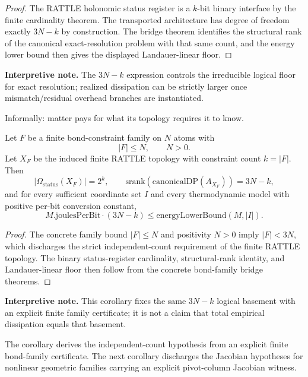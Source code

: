 \begin{proof}
The RATTLE holonomic status register is a $k$-bit binary interface by the finite cardinality theorem. The transported architecture has degree of freedom exactly $3N-k$ by construction. The bridge theorem identifies the structural rank of the canonical exact-resolution problem with that same count, and the energy lower bound then gives the displayed Landauer-linear floor.
\end{proof}

\textbf{Interpretive note.} The $3N-k$ expression controls the irreducible logical floor for exact resolution; realized dissipation can be strictly larger once mismatch/residual overhead branches are instantiated.

Informally: matter pays for what its topology requires it to know.

\begin{corollary}\label{cor:bond-family-holonomic-floor}
Let $F$ be a finite bond-constraint family on $N$ atoms with
\[
|F| \le N,
\qquad N>0.
\]
Let $X_F$ be the induced finite RATTLE topology with constraint count $k=|F|$. Then
\[
\left|\Omega_{\mathrm{status}}(X_F)\right| = 2^k,
\qquad
\mathrm{srank}(\mathrm{canonicalDP}(A_{X_F})) = 3N-k,
\]
and for every sufficient coordinate set $I$ and every thermodynamic model with positive per-bit conversion constant,
\[
M.\mathrm{joulesPerBit}\cdot(3N-k)
\le
\mathrm{energyLowerBound}(M,|I|).
\]
\end{corollary}

\begin{proof}
The concrete family bound $|F|\le N$ and positivity $N>0$ imply $|F|<3N$, which discharges the strict independent-count requirement of the finite RATTLE topology. The binary status-register cardinality, structural-rank identity, and Landauer-linear floor then follow from the concrete bond-family bridge theorems.
\end{proof}

\textbf{Interpretive note.} This corollary fixes the same $3N-k$ logical basement with an explicit finite family certificate; it is not a claim that total empirical dissipation equals that basement.

\begin{remark}\label{rem:bond-family-scope}
The corollary derives the independent-count hypothesis from an explicit finite bond-family certificate. The next corollary discharges the Jacobian hypotheses for nonlinear geometric families carrying an explicit pivot-column Jacobian witness.
\end{remark}

